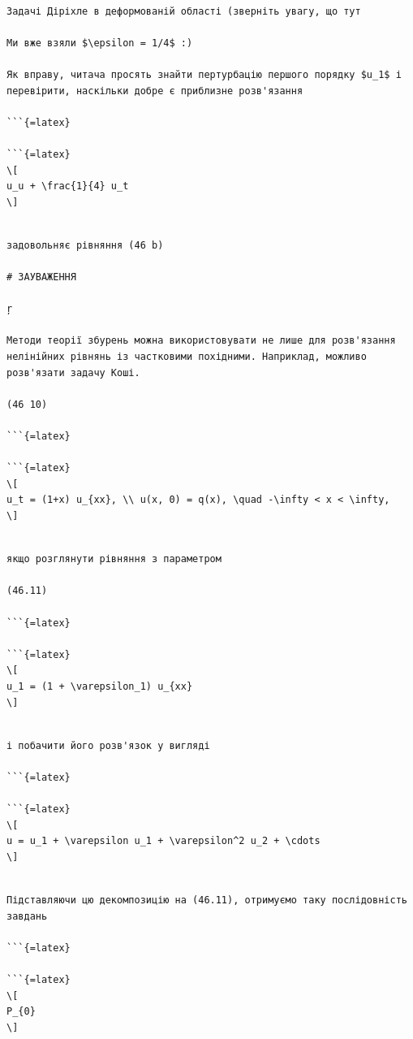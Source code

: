 \documentclass[
]{article}
\begin{document}
\begin{verbatim}

Задачі Діріхле в деформованій області (зверніть увагу, що тут

Ми вже взяли $\epsilon = 1/4$ :)

Як вправу, читача просять знайти пертурбацію першого порядку $u_1$ і перевірити, наскільки добре є приблизне розв'язання

```{=latex}

```{=latex}
\[
u_u + \frac{1}{4} u_t
\]
\end{verbatim}

\begin{verbatim}

задовольняє рівняння (46 b)

# ЗАУВАЖЕННЯ

ŗ

Методи теорії збурень можна використовувати не лише для розв'язання нелінійних рівнянь із частковими похідними. Наприклад, можливо розв'язати задачу Коші.

(46 10)

```{=latex}

```{=latex}
\[
u_t = (1+x) u_{xx}, \\ u(x, 0) = q(x), \quad -\infty < x < \infty,
\]
\end{verbatim}

\begin{verbatim}

якщо розглянути рівняння з параметром

(46.11)

```{=latex}

```{=latex}
\[
u_1 = (1 + \varepsilon_1) u_{xx}
\]
\end{verbatim}

\begin{verbatim}

і побачити його розв'язок у вигляді

```{=latex}

```{=latex}
\[
u = u_1 + \varepsilon u_1 + \varepsilon^2 u_2 + \cdots
\]
\end{verbatim}

\begin{verbatim}

Підставляючи цю декомпозицію на (46.11), отримуємо таку послідовність завдань

```{=latex}

```{=latex}
\[
P_{0}
\]
\end{verbatim}
\end{document}
